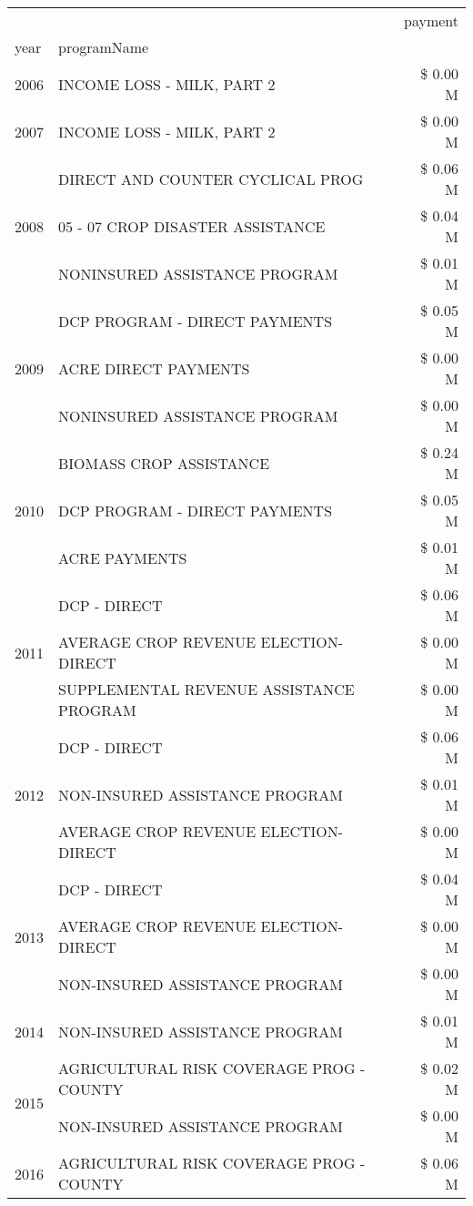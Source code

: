 \begin{tabular}{llr}
\toprule
 &  & payment \\
year & programName &  \\
\midrule
2006 & INCOME LOSS - MILK, PART 2 & \$ 0.00 M \\
\cline{1-3}
2007 & INCOME LOSS - MILK, PART 2 & \$ 0.00 M \\
\cline{1-3}
\multirow[t]{3}{*}{2008} & DIRECT AND COUNTER CYCLICAL PROG & \$ 0.06 M \\
 & 05 - 07 CROP DISASTER ASSISTANCE & \$ 0.04 M \\
 & NONINSURED ASSISTANCE PROGRAM & \$ 0.01 M \\
\cline{1-3}
\multirow[t]{3}{*}{2009} & DCP PROGRAM - DIRECT PAYMENTS & \$ 0.05 M \\
 & ACRE DIRECT PAYMENTS & \$ 0.00 M \\
 & NONINSURED ASSISTANCE PROGRAM & \$ 0.00 M \\
\cline{1-3}
\multirow[t]{3}{*}{2010} & BIOMASS CROP ASSISTANCE & \$ 0.24 M \\
 & DCP PROGRAM - DIRECT PAYMENTS & \$ 0.05 M \\
 & ACRE PAYMENTS & \$ 0.01 M \\
\cline{1-3}
\multirow[t]{3}{*}{2011} & DCP - DIRECT & \$ 0.06 M \\
 & AVERAGE CROP REVENUE ELECTION-DIRECT & \$ 0.00 M \\
 & SUPPLEMENTAL REVENUE ASSISTANCE PROGRAM & \$ 0.00 M \\
\cline{1-3}
\multirow[t]{3}{*}{2012} & DCP - DIRECT & \$ 0.06 M \\
 & NON-INSURED ASSISTANCE PROGRAM & \$ 0.01 M \\
 & AVERAGE CROP REVENUE ELECTION-DIRECT & \$ 0.00 M \\
\cline{1-3}
\multirow[t]{3}{*}{2013} & DCP - DIRECT & \$ 0.04 M \\
 & AVERAGE CROP REVENUE ELECTION-DIRECT & \$ 0.00 M \\
 & NON-INSURED ASSISTANCE PROGRAM & \$ 0.00 M \\
\cline{1-3}
2014 & NON-INSURED ASSISTANCE PROGRAM & \$ 0.01 M \\
\cline{1-3}
\multirow[t]{2}{*}{2015} & AGRICULTURAL RISK COVERAGE PROG - COUNTY & \$ 0.02 M \\
 & NON-INSURED ASSISTANCE PROGRAM & \$ 0.00 M \\
\cline{1-3}
\multirow[t]{2}{*}{2016} & AGRICULTURAL RISK COVERAGE PROG - COUNTY & \$ 0.06 M \\

\end{tabular}
